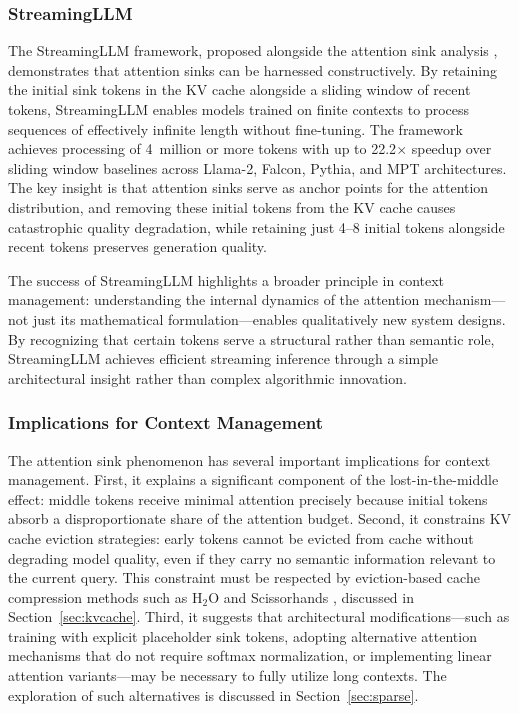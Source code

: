 \documentclass[11pt,letterpaper]{article}
\begin{document}
\subsubsection{StreamingLLM}

The StreamingLLM framework, proposed alongside the attention sink analysis \cite{xiao2024efficient}, demonstrates that attention sinks can be harnessed constructively. By retaining the initial sink tokens in the KV cache alongside a sliding window of recent tokens, StreamingLLM enables models trained on finite contexts to process sequences of effectively infinite length without fine-tuning. The framework achieves processing of 4~million or more tokens with up to 22.2$\times$ speedup over sliding window baselines across Llama-2, Falcon, Pythia, and MPT architectures. The key insight is that attention sinks serve as anchor points for the attention distribution, and removing these initial tokens from the KV cache causes catastrophic quality degradation, while retaining just 4--8 initial tokens alongside recent tokens preserves generation quality.

The success of StreamingLLM highlights a broader principle in context management: understanding the internal dynamics of the attention mechanism---not just its mathematical formulation---enables qualitatively new system designs. By recognizing that certain tokens serve a structural rather than semantic role, StreamingLLM achieves efficient streaming inference through a simple architectural insight rather than complex algorithmic innovation.

\subsubsection{Implications for Context Management}

The attention sink phenomenon has several important implications for context management. First, it explains a significant component of the lost-in-the-middle effect: middle tokens receive minimal attention precisely because initial tokens absorb a disproportionate share of the attention budget. Second, it constrains KV cache eviction strategies: early tokens cannot be evicted from cache without degrading model quality, even if they carry no semantic information relevant to the current query. This constraint must be respected by eviction-based cache compression methods such as H$_2$O \cite{zhang2024h2o} and Scissorhands \cite{liu2023scissorhands}, discussed in Section~\ref{sec:kvcache}. Third, it suggests that architectural modifications---such as training with explicit placeholder sink tokens, adopting alternative attention mechanisms that do not require softmax normalization, or implementing linear attention variants---may be necessary to fully utilize long contexts. The exploration of such alternatives is discussed in Section~\ref{sec:sparse}.
\end{document}
